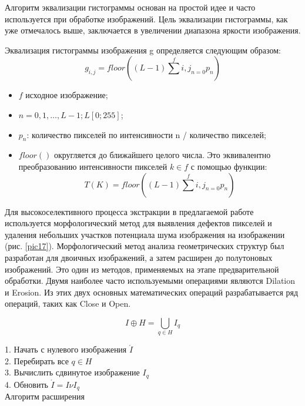 \documentclass[a4paper,14pt]{extreport}
\begin{document}
Алгоритм эквализации гистограммы основан на простой идее и часто используется при обработке изображений. Цель эквализации гистограммы, как уже отмечалось выше, заключается в увеличении диапазона яркости изображения.

Эквализация гистограммы изображения g определяется следующим образом:
\begin{equation}\label{eq2}
g_{i,j}=floor \left(\left(L-1\right)\sum^f{i,j}_{n=0} p_n\right)
\end{equation}

\begin{itemize}
	\item $	f$  исходное изображение;
	\item $n=0,1,…,L-1;L [0 ; 255]$;
	\item $p_n$: количество пикселей по интенсивности  n / количество пикселей;
	\item $floor()$ округляется до ближайшего целого числа. Это эквивалентно преобразованию интенсивности пикселей $k \in f$ с помощью функции:
	\begin{equation}\label{eq3}
T\left(K\right)=floor\left(\left(L-1\right)\sum^f{i,j}_{n=0} p_n\right)
\end{equation}
\end{itemize}
Для высокоселективного процесса экстракции в предлагаемой работе используется морфологический метод для выявления дефектов пикселей и удаления небольших участков потенциала шума изображения на изображении (рис. \ref{pic17}). Морфологический метод анализа геометрических структур был разработан для двоичных изображений, а затем расширен до полутоновых изображений. Это один из методов, применяемых на этапе предварительной обработки. Двумя наиболее часто используемыми операциями являются Dilation и Erosion. Из этих двух основных математических операций разрабатывается ряд операций, таких как Close и Open.

\begin{equation}\label{eq4}
I\oplus H = \bigcup_{q \in H} I_q
\end{equation}

\begin{algorithm}[H]
 1. Начать с нулевого изображения $\acute{I}$\\
 2. Перебирать все $q \in H$\\
 3. Вычислить сдвинутое изображение $I_q$\\
 4. Обновить $\acute{I} = I \nu I_q $\\
\caption{Алгоритм расширения}\label{alg1}
\end{algorithm}
\end{document}
